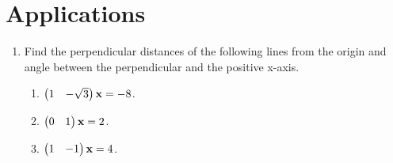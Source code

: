 \documentclass[journal,12pt,twocolumn]{IEEEtran}
\renewcommand\thesection{\arabic{section}}
\begin{document}
\section{Applications}
\renewcommand{\theequation}{\theenumi}
\begin{enumerate}[label=\thesection.\arabic*.,ref=\thesection.\theenumi]
\item Find the perpendicular distances of the following lines from the origin and angle between the perpendicular and the positive x-axis.
\begin{enumerate}
\item $\begin{pmatrix}1 & -\sqrt{3}\end{pmatrix}\mathbf{x} = -8$.
\item $\begin{pmatrix}0 & 1\end{pmatrix}\mathbf{x} = 2$.
\item $\begin{pmatrix}1 & -1\end{pmatrix}\mathbf{x} = 4$.
\end{enumerate}


\end{enumerate}
\end{document}
